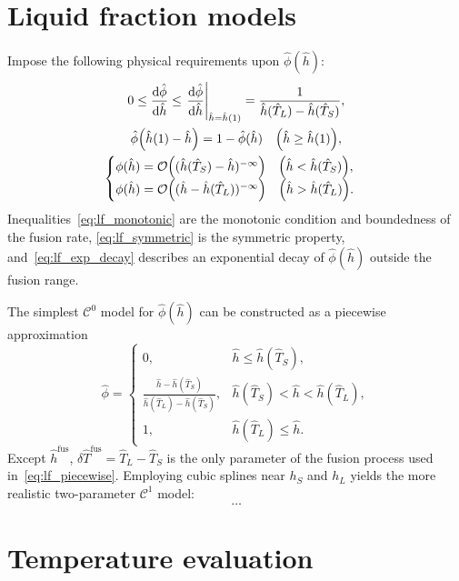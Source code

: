 \documentclass{article}
\newcommand{\fusion}[1]{{#1}^\mathrm{fus}}
\newcommand{\Hh}{\hat{h}}
\newcommand{\HT}{\hat{T}}
\newcommand{\Hphi}{\hat{\phi}}
\begin{document}
\section{Liquid fraction models}

Impose the following physical requirements upon \(\hat\phi(\Hh)\):
\begin{gather}
    0 \leq \dv{\hat\phi}{\Hh} \leq \eval{\dv{\hat\phi}{\Hh}}_{\Hh=\Hh(1)} =
        \frac1{\Hh(\HT_L)-\Hh(\HT_S)}, \label{eq:lf_monotonic}\\
    \hat\phi\qty(\Hh(1) - \Hh) = 1 - \hat\phi(\Hh) \quad \qty(\Hh\geq\Hh(1)), \label{eq:lf_symmetric}\\
    \begin{cases}
	\phi(\Hh) = \order{(\Hh(\HT_S)-\Hh)^{-\infty}} \quad \qty(\Hh < \Hh(\HT_S)), \\
	    \phi(\Hh) = \order{(\Hh-\Hh(\HT_L))^{-\infty}} \quad \qty(\Hh > \Hh(\HT_L)).
	\end{cases}\label{eq:lf_exp_decay}
\end{gather}
Inequalities~\eqref{eq:lf_monotonic} are the monotonic condition and boundedness of the fusion rate,
\eqref{eq:lf_symmetric} is the symmetric property,
and~\eqref{eq:lf_exp_decay} describes an exponential decay of \(\hat\phi(\Hh)\) outside the fusion range.

The simplest \(\mathcal{C}^0\) model for \(\Hphi(\Hh)\) can be constructed as a piecewise approximation
\begin{equation}\label{eq:lf_piecewise}
	\Hphi = \begin{cases}
        0,                                            & \Hh \leq \Hh(\HT_S), \\
        \frac{\Hh-\Hh(\HT_S)}{\Hh(\HT_L)-\Hh(\HT_S)}, & \Hh(\HT_S) < \Hh < \Hh(\HT_L), \\
        1,                                            & \Hh(\HT_L) \leq \Hh.
    \end{cases}
\end{equation}
Except \(\fusion{\Hh}\), \(\delta\fusion{\HT} = \HT_L - \HT_S\)
is the only parameter of the fusion process  used in~\eqref{eq:lf_piecewise}.
Employing cubic splines near \(h_S\) and \(h_L\) yields the more realistic two-parameter \(\mathcal{C}^1\) model:
\begin{equation}\label{eq:lf_splines}
	\dots
\end{equation}

\section{Temperature evaluation}
\end{document}
